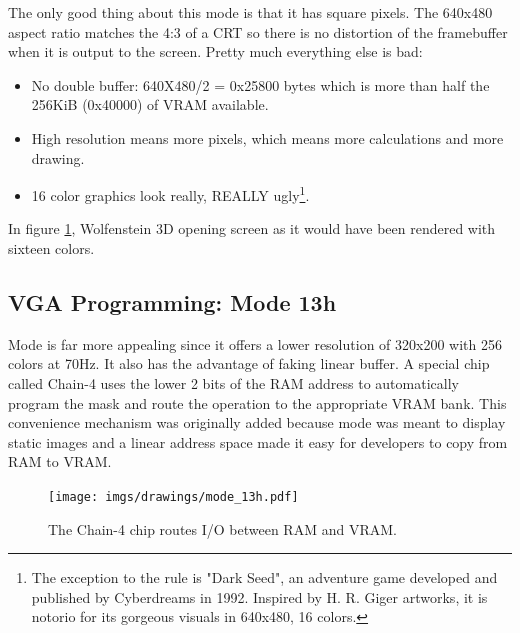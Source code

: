 \documentclass[book.tex]{subfiles}
\begin{document}
The only good thing about this mode is that it has square pixels. The 640x480 aspect ratio matches the 4:3 of a CRT so there is no distortion of the framebuffer when it is output to the screen. Pretty much everything else is bad:\\
\begin{itemize}
\item No double buffer: 640X480/2 = 0x25800 bytes which is more than half the 256KiB (0x40000) of VRAM available.
\item High resolution means more pixels, which means more calculations and more drawing.
\item 16 color graphics look really, REALLY ugly\footnote{The exception to the rule is "Dark Seed", an adventure game developed and published by Cyberdreams in 1992. Inspired by H. R. Giger artworks, it is notorio for its gorgeous visuals in 640x480, 16 colors.}.
\end{itemize}

 \begin{figure}[H]
\centering
 \caption{}
 \label{wolf16}
\end{figure}
\par
In figure \ref{wolf16}, Wolfenstein 3D opening screen as it would have been rendered with sixteen colors.




 \pagebreak
  \subsection{VGA Programming: Mode 13h}
  Mode  is far more appealing since it offers a lower resolution of 320x200 with 256 colors at 70Hz. It also has the advantage of faking linear buffer. A special chip called Chain-4 uses the lower 2 bits of the RAM address to automatically program the mask and route the operation to the appropriate VRAM bank. This convenience mechanism was originally added because mode  was meant to display static images and a linear address space made it easy for developers to copy from RAM to VRAM.\\
  \par
 \begin{figure}[H]
\centering
      \texttt{[image: imgs/drawings/mode\_13h.pdf]}
      \caption{The Chain-4 chip routes I/O between RAM and VRAM.}
\end{figure}
\par
\end{document}
